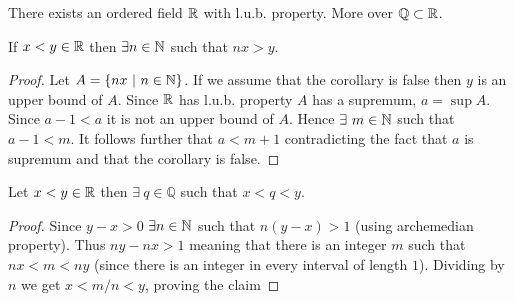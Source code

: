 \begin{theorem}
  There exists an ordered field $\mathbb{R}$ with l.u.b. property. More over $ \mathbb{Q} \subset \mathbb{R}$.
\end{theorem}
\begin{corollary}
  If $x<y\in \mathbb{R}$ then $\exists n\in \mathbb{N}$ such that $nx>y$.
\end{corollary}
\begin{proof}
  Let $A = \{nx\ |\ n\in \mathbb{N}\}$. If we assume that the corollary is false then $y$ is an upper bound of $A$. Since $\mathbb{R}$ has l.u.b. property $A$ has a supremum, $a = \sup A$. Since $a - 1< a$ it is not an upper bound of $A$. Hence $\exists\ m\in \mathbb{N}$ such that $a-1<m$. It follows further that $a<m+1$ contradicting the fact that $a$ is supremum and that the corollary is false. 
\end{proof}
\begin{corollary}
  Let $x<y\in \mathbb{R}$ then $\exists\ q\in \mathbb{Q}$ such that $x<q<y$.
\end{corollary}
\begin{proof}
  Since $y-x>0$ $\exists n \in \mathbb{N}$ such that $n(y-x)>1$ (using archemedian property). Thus $ny - nx >1$ meaning that there is an integer $m$ such that $nx<m<ny$ (since there is an integer in every interval of length $1$). Dividing by $n$ we get $x<m/n<y$, proving the claim
\end{proof}
